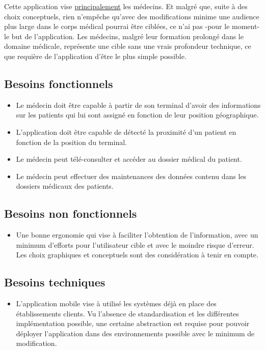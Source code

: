 Cette application vise \underline{principalement} les médecins. Et malgré que,
suite à des choix conceptuels, rien n'empêche qu'avec des modifications minime
une audience plus large dans le corps médical pourrai être ciblées, ce n'ai pas
-pour le moment- le but de l'application. Les médecins, malgré leur formation
prolongé dans le domaine médicale, représente une cible sans une vrais
profondeur technique, ce que requière de l'application d'être le plus simple
possible.

\subsection{Besoins fonctionnels}
\begin{itemize}

\item Le médecin doit être capable à partir de son terminal d'avoir des
informations sur les patients qui lui sont assigné en fonction de leur position
géographique.

\item L'application doit être capable de détecté la proximité d'un patient en fonction de la position du terminal.

\item Le médecin peut télé-consulter et accéder au dossier médical du patient.

\item Le médecin peut effectuer des maintenances des données contenu dans les
dossiers médicaux des patients.

\end{itemize}

\subsection{Besoins non fonctionnels}
\begin{itemize}

\item Une bonne ergonomie qui vise à faciliter l'obtention de l'information,
avec un minimum d'efforts pour l'utilisateur cible et avec le moindre risque
d'erreur. Les choix graphiques et conceptuels sont des considération à tenir
en compte.

\end{itemize}

\subsection{Besoins techniques}
\begin{itemize}

\item L'application mobile vise à utilisé les systèmes déjà en place des
établissements clients. Vu l'absence de standardisation et les différentes
implémentation possible, une certaine abstraction est requise pour pouvoir
déployer l'application dans des environnements possible avec le minimum de
modification.

\end{itemize}

